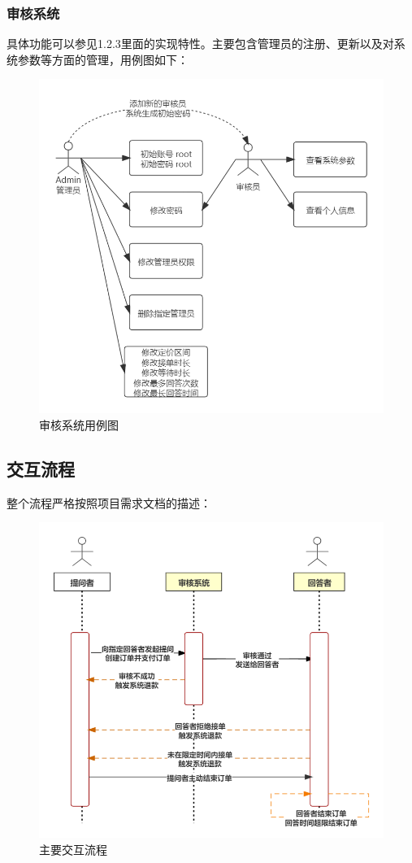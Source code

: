 \documentclass[12pt]{ctexart}
\begin{document}
\subsubsection{审核系统}
具体功能可以参见1.2.3里面的实现特性。主要包含管理员的注册、更新以及对系统参数等方面的管理，用例图如下：
\begin{figure}[H]
	\includegraphics{4.png}\caption{审核系统用例图}
\end{figure}
\subsection{交互流程}
整个流程严格按照项目需求文档的描述：
\begin{figure}[H]
	\includegraphics{2.png}\caption{主要交互流程}
\end{figure}
\end{document}
